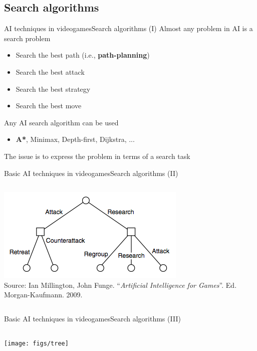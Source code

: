 \documentclass[10pt,compress]{beamer} %
\begin{document}
\subsection{Search algorithms}
\begin{frame}{AI techniques in videogames}{Search algorithms (I)}
	Almost any problem in AI is a search problem
		\begin{itemize}
		\item Search the best path (i.e., \textbf{path-planning})
		\item Search the best attack
		\item Search the best strategy
		\item Search the best move
		\end{itemize}
	Any AI search algorithm can be used
		\begin{itemize}
		\item \textbf{A*}, Minimax, Depth-first, Dijkstra, ... 
		\end{itemize}
	The issue is to express the problem in terms of a search task
\end{frame}

\begin{frame}{Basic AI techniques in videogames}{Search algorithms (II)}
    \begin{columns}


        \vspace{-0.2cm}
        \includegraphics[width=0.9\linewidth]{figs/tree5.png}\\
        \tiny
        Source: Ian Millington, John Funge. ``\textit{Artificial Intelligence for Games}''. Ed. Morgan-Kaufmann. 2009.
	\end{columns}
\end{frame}

\begin{frame}{Basic AI techniques in videogames}{Search algorithms (III)}
    \begin{columns}
		\centering\texttt{[image: figs/tree]}
	\end{columns}
\end{frame}
\end{document}
